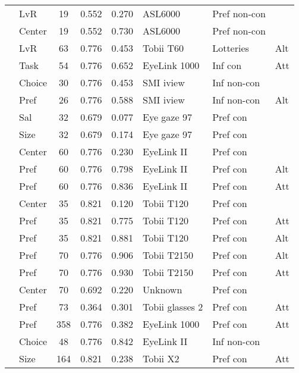 \begin{longtable}{p{5cm}lccclll}
  \cite{kreplin2014a} & LvR & 19 & 0.552 & 0.270 & ASL6000 & Pref non-con &  \\ 
  \cite{kreplin2014a} & Center & 19 & 0.552 & 0.730 & ASL6000 & Pref non-con &  \\ 
  \cite{kwak2018} & LvR & 63 & 0.776 & 0.453 & Tobii T60 & Lotteries & Alt \\ 
  \cite{leboeuf2016} & Task & 54 & 0.776 & 0.652 & EyeLink 1000 & Inf con & Att \\ 
  \cite{lindner2014} & Choice & 30 & 0.776 & 0.453 & SMI iview & Inf non-con &  \\ 
  \cite{lindner2014} & Pref & 26 & 0.776 & 0.588 & SMI iview & Inf non-con & Alt \\ 
  \cite{lohse1997a} & Sal & 32 & 0.679 & 0.077 & Eye gaze 97 & Pref con &  \\ 
  \cite{lohse1997a} & Size & 32 & 0.679 & 0.174 & Eye gaze 97 & Pref con &  \\ 
  \cite{meissner2016a} & Center & 60 & 0.776 & 0.230 & EyeLink II & Pref con &  \\ 
  \cite{meissner2016a} & Pref & 60 & 0.776 & 0.798 & EyeLink II & Pref con & Alt \\ 
  \cite{meissner2016a} & Pref & 60 & 0.776 & 0.836 & EyeLink II & Pref con & Att \\ 
  \cite{meissner2016a} & Center & 35 & 0.821 & 0.120 & Tobii T120 & Pref con &  \\ 
  \cite{meissner2016a} & Pref & 35 & 0.821 & 0.775 & Tobii T120 & Pref con & Att \\ 
  \cite{meissner2016a} & Pref & 35 & 0.821 & 0.881 & Tobii T120 & Pref con & Alt \\ 
  \cite{meissner2016a} & Pref & 70 & 0.776 & 0.906 & Tobii T2150 & Pref con & Alt \\ 
  \cite{meissner2016a} & Pref & 70 & 0.776 & 0.930 & Tobii T2150 & Pref con & Att \\ 
  \cite{meissner2016a} & Center & 70 & 0.692 & 0.220 & Unknown & Pref con &  \\ 
  \cite{meyerding2018} & Pref & 73 & 0.364 & 0.301 & Tobii glasses 2 & Pref con & Att \\ 
  \cite{miller2015} & Pref & 358 & 0.776 & 0.382 & EyeLink 1000 & Pref con & Att \\ 
  \cite{mitsuda2014} & Choice & 48 & 0.776 & 0.842 & EyeLink II & Inf non-con &  \\ 
  \cite{neuhofer2020} & Size & 164 & 0.821 & 0.238 & Tobii X2 & Pref con & Att \\ 

\end{longtable}
